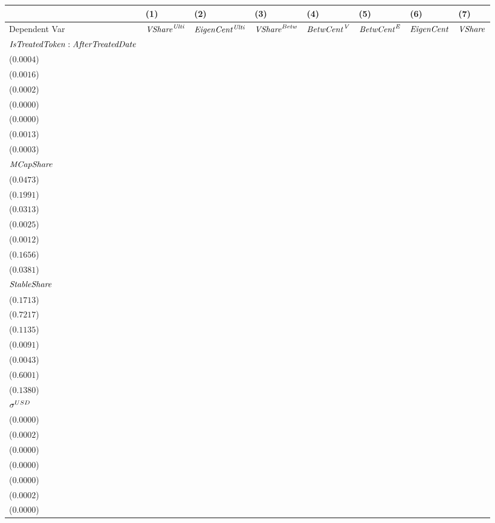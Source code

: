 \begin{tabular}{llllllll}
\toprule
 & (1) & (2) & (3) & (4) & (5) & (6) & (7) \\
\midrule
Dependent Var & ${\it {VShare}^{\it Ulti}}$ & ${\it EigenCent^{\it Ulti}}$ & ${\it VShare}^{\it Betw}$ & ${\it BetwCent}^{\it V}$ & ${\it BetwCent}^{\it E}$ & ${\it EigenCent}$ & ${\it VShare}$ \\
${\it IsTreatedToken}:{\it AfterTreatedDate}$ & \makecell{$0.0035^{***}$ \\ ($0.0004$)} & \makecell{$0.0149^{***}$ \\ ($0.0016$)} & \makecell{$-0.0013^{***}$ \\ ($0.0002$)} & \makecell{$-0.0001^{***}$ \\ ($0.0000$)} & \makecell{$-0.0001^{***}$ \\ ($0.0000$)} & \makecell{$0.0117^{***}$ \\ ($0.0013$)} & \makecell{$0.0027^{***}$ \\ ($0.0003$)} \\
${\it MCapShare}$ & \makecell{$0.6586^{***}$ \\ ($0.0473$)} & \makecell{$2.6941^{***}$ \\ ($0.1991$)} & \makecell{$0.0477^{}$ \\ ($0.0313$)} & \makecell{$0.0040^{}$ \\ ($0.0025$)} & \makecell{$0.0029^{**}$ \\ ($0.0012$)} & \makecell{$2.2211^{***}$ \\ ($0.1656$)} & \makecell{$0.5207^{***}$ \\ ($0.0381$)} \\
${\it StableShare}$ & \makecell{$-0.1914^{}$ \\ ($0.1713$)} & \makecell{$-0.9332^{}$ \\ ($0.7217$)} & \makecell{$0.4176^{***}$ \\ ($0.1135$)} & \makecell{$0.0330^{***}$ \\ ($0.0091$)} & \makecell{$0.0095^{**}$ \\ ($0.0043$)} & \makecell{$-0.5940^{}$ \\ ($0.6001$)} & \makecell{$-0.0621^{}$ \\ ($0.1380$)} \\
${\it \sigma}^{USD}$ & \makecell{$-0.0001^{}$ \\ ($0.0000$)} & \makecell{$-0.0003^{}$ \\ ($0.0002$)} & \makecell{$0.0000^{}$ \\ ($0.0000$)} & \makecell{$0.0000^{}$ \\ ($0.0000$)} & \makecell{$0.0000^{}$ \\ ($0.0000$)} & \makecell{$-0.0003^{*}$ \\ ($0.0002$)} & \makecell{$-0.0000^{}$ \\ ($0.0000$)} \\

\end{tabular}
